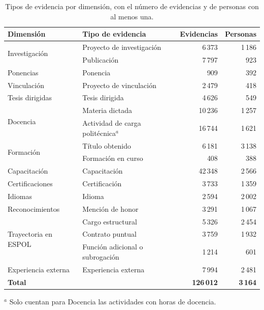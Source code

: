 \begin{table}[!htbp]
    \centering
    \caption{Tipos de evidencia por dimensión, con el número de evidencias y de personas con al menos una.}
    \label{tab:evidencias}
    \small
    \begin{tabular}{p{3.4cm} p{6.4cm} r r}
        \toprule
        \textbf{Dimensión} & \textbf{Tipo de evidencia} & \textbf{Evidencias} & \textbf{Personas} \\
        \midrule
        \multirow{2}{*}{Investigación} & Proyecto de investigación & 6\,373 & 1\,186 \\
         & Publicación & 7\,797 & 923 \\
        Ponencias & Ponencia & 909 & 392 \\
        Vinculación & Proyecto de vinculación & 2\,479 & 418 \\
        Tesis dirigidas & Tesis dirigida & 4\,626 & 549 \\
        \multirow{2}{*}{Docencia} & Materia dictada & 10\,236 & 1\,257 \\
         & Actividad de carga politécnica$^{a}$ & 16\,744 & 1\,621 \\
        \multirow{2}{*}{Formación} & Título obtenido & 6\,181 & 3\,138 \\
         & Formación en curso & 408 & 388 \\
        Capacitación & Capacitación & 42\,348 & 2\,566 \\
        Certificaciones & Certificación & 3\,733 & 1\,359 \\
        Idiomas & Idioma & 2\,594 & 2\,002 \\
        Reconocimientos & Mención de honor & 3\,291 & 1\,067 \\
        \multirow{3}{*}{Trayectoria en ESPOL} & Cargo estructural & 5\,326 & 2\,454 \\
         & Contrato puntual & 3\,759 & 1\,932 \\
         & Función adicional o subrogación & 1\,214 & 601 \\
        Experiencia externa & Experiencia externa & 7\,994 & 2\,481 \\
        \midrule
        \multicolumn{2}{l}{\textbf{Total}} & \textbf{126\,012} & \textbf{3\,164} \\
        \bottomrule
    \end{tabular}
    \par\smallskip
    \raggedright\footnotesize $^{a}$ Solo cuentan para Docencia las actividades con horas de docencia.
\end{table}


